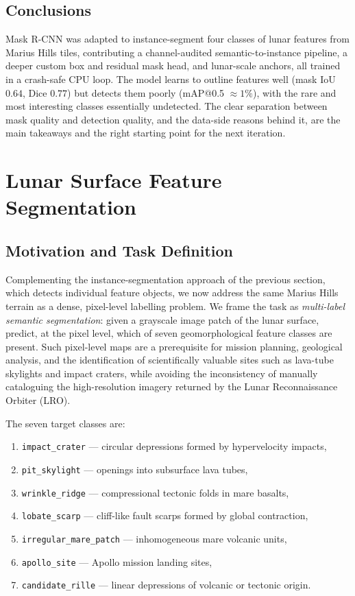 \documentclass{aa}
\begin{document}
\subsection{Conclusions}
\label{sec:conclusions}
Mask R-CNN was adapted to instance-segment four classes of lunar features from
Marius Hills tiles, contributing a channel-audited semantic-to-instance pipeline, a
deeper custom box and residual mask head, and lunar-scale anchors, all trained in a
crash-safe CPU loop. The model learns to outline features well (mask IoU $0.64$,
Dice $0.77$) but detects them poorly (mAP@0.5 $\approx 1\%$), with the rare and
most interesting classes essentially undetected. The clear separation between mask
quality and detection quality, and the data-side reasons behind it, are the main
takeaways and the right starting point for the next iteration.

\section{Lunar Surface Feature Segmentation}
\label{sec:moon_recognition}

\subsection{Motivation and Task Definition}
\label{sec:mr_motivation}

Complementing the instance-segmentation approach of the previous section, which detects individual feature objects, we now address the same Marius Hills terrain as a dense, pixel-level labelling problem. We frame the task as \textit{multi-label semantic segmentation}: given a grayscale image patch of the lunar surface, predict, at the pixel level, which of seven geomorphological feature classes are present. Such pixel-level maps are a prerequisite for mission planning, geological analysis, and the identification of scientifically valuable sites such as lava-tube skylights and impact craters, while avoiding the inconsistency of manually cataloguing the high-resolution imagery returned by the Lunar Reconnaissance Orbiter (LRO).

The seven target classes are:
\begin{enumerate}
    \item \texttt{impact\_crater} --- circular depressions formed by hypervelocity impacts,
    \item \texttt{pit\_skylight} --- openings into subsurface lava tubes,
    \item \texttt{wrinkle\_ridge} --- compressional tectonic folds in mare basalts,
    \item \texttt{lobate\_scarp} --- cliff-like fault scarps formed by global contraction,
    \item \texttt{irregular\_mare\_patch} --- inhomogeneous mare volcanic units,
    \item \texttt{apollo\_site} --- Apollo mission landing sites,
    \item \texttt{candidate\_rille} --- linear depressions of volcanic or tectonic origin.
\end{enumerate}
\end{document}
